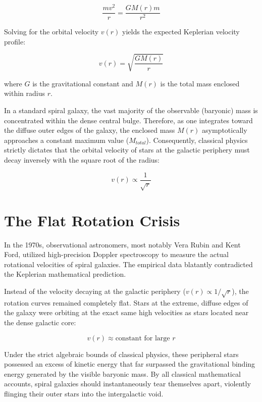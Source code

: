 \documentclass[12pt,openany]{book}
\begin{document}
\begin{equation}
\frac{mv^2}{r} = \frac{GM(r)m}{r^2}
\end{equation}

Solving for the orbital velocity $v(r)$ yields the expected Keplerian velocity profile:

\begin{equation}
v(r) = \sqrt{\frac{GM(r)}{r}}
\end{equation}

where $G$ is the gravitational constant and $M(r)$ is the total mass enclosed within radius $r$. 

In a standard spiral galaxy, the vast majority of the observable (baryonic) mass is concentrated within the dense central bulge. Therefore, as one integrates toward the diffuse outer edges of the galaxy, the enclosed mass $M(r)$ asymptotically approaches a constant maximum value ($M_{total}$). Consequently, classical physics strictly dictates that the orbital velocity of stars at the galactic periphery must decay inversely with the square root of the radius:

\begin{equation}
v(r) \propto \frac{1}{\sqrt{r}}
\end{equation}

\section{The Flat Rotation Crisis}
In the 1970s, observational astronomers, most notably Vera Rubin and Kent Ford, utilized high-precision Doppler spectroscopy to measure the actual rotational velocities of spiral galaxies. The empirical data blatantly contradicted the Keplerian mathematical prediction. 

Instead of the velocity decaying at the galactic periphery ($v(r) \propto 1/\sqrt{r}$), the rotation curves remained completely flat. Stars at the extreme, diffuse edges of the galaxy were orbiting at the exact same high velocities as stars located near the dense galactic core:

\begin{equation}
v(r) \approx \text{constant for large } r
\end{equation}

Under the strict algebraic bounds of classical physics, these peripheral stars possessed an excess of kinetic energy that far surpassed the gravitational binding energy generated by the visible baryonic mass. By all classical mathematical accounts, spiral galaxies should instantaneously tear themselves apart, violently flinging their outer stars into the intergalactic void.
\end{document}
